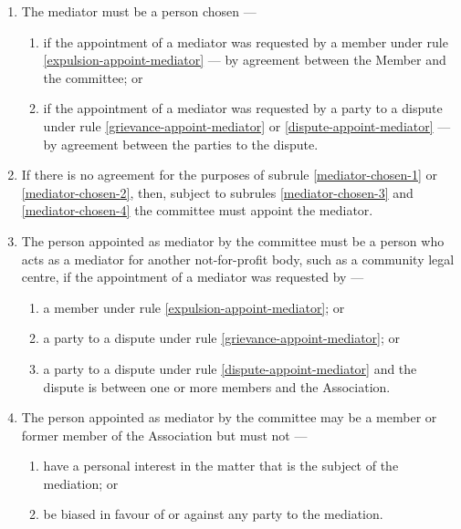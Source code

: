 \documentclass[../constitution.tex]{subfiles}
\begin{document}
\begin{enumerate}
  \item The mediator must be a person chosen ---

        \begin{enumerate}

          \item if the appointment of a mediator was requested by a member under rule \ref{expulsion-appoint-mediator} --- by agreement between the Member and the committee; or \label{mediator-chosen-1}
          \item if the appointment of a mediator was requested by a party to a dispute under rule \ref{grievance-appoint-mediator} or \ref{dispute-appoint-mediator} --- by agreement between the parties to the dispute. \label{mediator-chosen-2}
        \end{enumerate}
  \item If there is no agreement for the purposes of subrule \ref{mediator-chosen-1} or \ref{mediator-chosen-2}, then, subject to subrules \ref{mediator-chosen-3} and \ref{mediator-chosen-4} the committee must appoint the mediator.
  \item The person appointed as mediator by the committee must be a person who acts as a mediator for another not-for-profit body, such as a community legal centre, if the appointment of a mediator was requested by --- \label{mediator-chosen-3}

        \begin{enumerate}

          \item a member under rule \ref{expulsion-appoint-mediator}; or
          \item a party to a dispute under rule \ref{grievance-appoint-mediator}; or
          \item a party to a dispute under rule \ref{dispute-appoint-mediator} and the dispute is between one or more members and the Association.
        \end{enumerate}
  \item The person appointed as mediator by the committee may be a member or former member of the Association but must not --- \label{mediator-chosen-4}

        \begin{enumerate}

          \item have a personal interest in the matter that is the subject of the mediation; or
          \item be biased in favour of or against any party to the mediation.
        \end{enumerate}
\end{enumerate}
\end{document}
